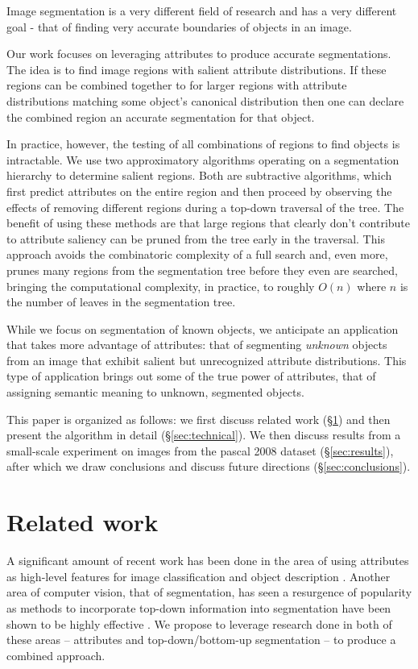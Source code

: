 \documentclass[10pt,twocolumn,letterpaper]{article}
\begin{document}
Image segmentation is a very different field of research and has a very different
goal - that of finding very accurate boundaries of objects in an image.

Our work focuses on leveraging attributes to produce accurate segmentations.
The idea is to find image regions with salient attribute distributions.  If
these regions can be combined together to for larger regions with attribute 
distributions matching some object's canonical distribution then one can
declare the combined region an accurate segmentation for that object.

In practice, however, the testing of all combinations of regions to find 
objects is intractable.  We use two approximatory algorithms operating on
a segmentation hierarchy to determine salient regions.  Both are subtractive
algorithms, which first predict attributes on the entire region and then
proceed by observing the effects of removing different regions during
a top-down traversal of the tree.  The benefit of using these methods are
that large regions that clearly don't contribute to attribute saliency
can be pruned from the tree early in the traversal.  This approach avoids
the combinatoric complexity of a full search and, even more, prunes many
regions from the segmentation tree before they even are searched, bringing
the computational complexity, in practice, to roughly $O(n)$ where $n$ is
the number of leaves in the segmentation tree.

While we focus on segmentation of known objects, we anticipate an application
that takes more advantage of attributes: that of segmenting \emph{unknown}
objects from an image that exhibit salient but unrecognized attribute
distributions.  This type of application brings out some of the true power of
attributes, that of assigning semantic meaning to unknown, segmented objects.

This paper is organized as follows: we first discuss related work (\S \ref{sec:related_work})
and then present the algorithm in detail (\S \ref{sec:technical}).  We then discuss results from
a small-scale experiment on images from the pascal 2008 dataset (\S \ref{sec:results}), after which we draw
conclusions and discuss future directions (\S \ref{sec:conclusions}).

\section{Related work}
\label{sec:related_work}
A significant amount of recent work has been done in the area of using
attributes as high-level features for image classification and object
description \cite{farhadi09, lampert09, kumar09}.  
Another area of computer vision, that of segmentation,
has seen a resurgence of popularity as methods to incorporate top-down
information into segmentation have been shown to be highly effective
\cite{borenstein04, pantofaru, gu09, russell06, malisiewicz, leibe04, hoiem05, shotton06}.  
We propose to leverage research done in both of these areas -- attributes
and top-down/bottom-up segmentation -- to produce a combined approach.
\end{document}
